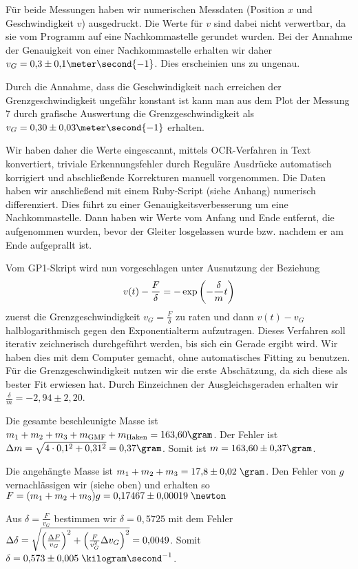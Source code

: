 \documentclass[a4paper,german,12pt,smallheadings]{scrartcl}
\begin{document}
Für beide Messungen haben wir numerischen Messdaten (Position $x$ und
Geschwindigkeit $v$) ausgedruckt. Die Werte für $v$ sind dabei nicht
verwertbar, da sie vom Programm auf eine Nachkommastelle gerundet wurden. Bei
der Annahme der Genauigkeit von einer Nachkommastelle erhalten wir daher $v_G =
0{,}3 \pm 0{,}1 \meter \second{-1}$. Dies erscheinien uns zu ungenau.

Durch die Annahme, dass die Geschwindigkeit nach erreichen der
Grenzgeschwindigkeit ungefähr konstant ist kann man aus dem Plot der Messung 7
durch grafische Auswertung die Grenzgeschwindigkeit als $v_G = 0{,}30 \pm
0{,}03 \meter \second{-1}$ erhalten.

Wir haben daher die Werte eingescannt, mittels OCR-Verfahren in Text konvertiert,
triviale Erkennungsfehler durch Reguläre Ausdrücke automatisch korrigiert und
abschließende Korrekturen manuell vorgenommen. Die Daten haben wir anschließend
mit einem Ruby-Script (siehe Anhang) numerisch differenziert. Dies führt zu
einer Genauigkeitsverbesserung um eine Nachkommastelle. Dann haben wir Werte
vom Anfang und Ende entfernt, die aufgenommen wurden, bevor der Gleiter
losgelassen wurde bzw. nachdem er am Ende aufgeprallt ist.

Vom GP1-Skript wird nun vorgeschlagen unter Ausnutzung der Beziehung
\begin{equation} v(t) - \frac{F}{\delta} = -\exp \del{- \frac{\delta}{m} t}
\end{equation} zuerst die Grenzgeschwindigkeit $v_G = \frac{F}{\delta}$ zu
raten und dann $v(t) - v_G$ halblogarithmisch gegen den Exponentialterm
aufzutragen. Dieses Verfahren soll iterativ zeichnerisch durchgeführt werden,
bis sich ein Gerade ergibt wird. Wir haben dies mit dem Computer gemacht, ohne
automatisches Fitting zu benutzen. Für die Grenzgeschwindigkeit nutzen wir die
erste Abschätzung, da sich diese als bester Fit erwiesen hat. Durch Einzeichnen
der Ausgleichsgeraden erhalten wir $\frac{\delta}{m} = -2{,}94 \pm 2{,}20$.

Die gesamte beschleunigte Masse ist $m_1 + m_2 + m_3 + m_\text{GMF} +
m_\text{Haken} = 163{,}60 \gram$. Der Fehler ist $\Delta m = \sqrt{4 \cdot
0{,}1^2 + 0{,}31^2} = 0{,}37 \gram$. Somit ist $m = 163{,}60 \pm 0{,}37 \gram$.

Die angehängte Masse ist $m_1 + m_2 + m_3 = 17{,}8 \pm 0{,}02 \;\gram$. Den
Fehler von $g$ vernachlässigen wir (siehe oben) und erhalten so $F = (m_1 + m_2
+ m_3) g = 0{,}17467\pm 0{,}00019 \;\newton$

Aus $\delta = \frac{F}{v_G}$ bestimmen wir $\delta = 0{,}5725$ mit dem Fehler
$\Delta \delta = \sqrt{\del{\frac{\Delta F}{v_G}}^2 + \del{\frac{F}{v_G^2}
\Delta v_G}^2} = 0{,}0049$. Somit $\delta =  0{,}573\pm0{,}005 \;
\kilogram\second^{-1}$.
\end{document}
